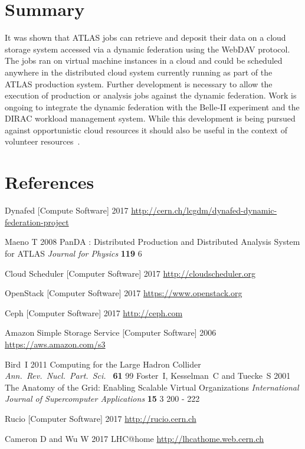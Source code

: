 \documentclass[a4paper]{jpconf}
\begin{document}
\section{Summary}
It was shown that ATLAS jobs can retrieve and deposit their data on a cloud storage system accessed via a dynamic federation using the WebDAV protocol. The jobs ran on virtual machine instances in a cloud and could be scheduled anywhere in the distributed cloud system currently running as part of the ATLAS production system. Further development is necessary to allow the execution of production or analysis jobs against the dynamic federation. Work is ongoing to integrate the dynamic federation with the Belle-II experiment and the DIRAC workload management system. While this development is being pursued against opportunistic cloud resources it should also be useful in the context of volunteer resources~\cite{boinc}.

\section*{References}
\begin{thebibliography}{9}
  Dynafed [Compute Software]
  2017
  \url{http://cern.ch/lcgdm/dynafed-dynamic-federation-project}

  Maeno T
  2008
  PanDA : Distributed Production and Distributed Analysis System for ATLAS
  {\it Journal for Physics} {\bf 119} 6

  Cloud Scheduler [Computer Software]
  2017
  \url{http://cloudscheduler.org}

  OpenStack [Computer Software]
  2017
  \url{https://www.openstack.org}

  Ceph [Computer Software]
  2017
  \url{http://ceph.com}

  Amazon Simple Storage Service [Computer Software]
  2006
  \url{https://aws.amazon.com/s3}

  Bird~I
  2011
  Computing for the Large Hadron Collider
  {\it Ann.\ Rev.\ Nucl.\ Part.\ Sci.\ } {\bf 61} 99
  Foster~I, Kesselman~C and Tuecke~S
  2001
  The Anatomy of the Grid: Enabling Scalable Virtual Organizations
  {\it International Journal of Supercomputer Applications} {\bf 15} 3 200 - 222

  Rucio [Computer Software]
  2017
  \url{http://rucio.cern.ch}

%
%
%

  Cameron D and Wu W
  2017
  LHC@home
  \url{http://lhcathome.web.cern.ch}

\end{thebibliography}
\end{document}
